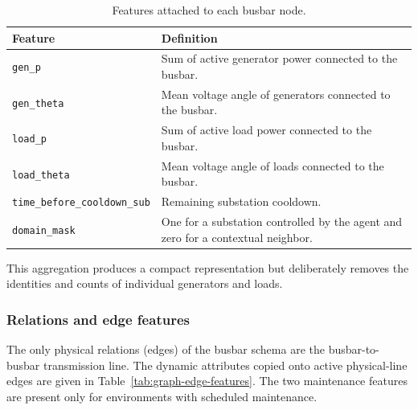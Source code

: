 \begin{table}[H]
  \centering
  \small
  \caption{Features attached to each busbar node.}
  \label{tab:graph-node-features}
  \setlength{\tabcolsep}{5pt}
  \begin{tabular}{L{0.28\textwidth}L{0.62\textwidth}}
    \toprule
    Feature & Definition \\
    \midrule
    \texttt{gen\_p} & Sum of active generator power connected to the busbar. \\
    \texttt{gen\_theta} & Mean voltage angle of generators connected to the busbar. \\
    \texttt{load\_p} & Sum of active load power connected to the busbar. \\
    \texttt{load\_theta} & Mean voltage angle of loads connected to the busbar. \\
    \texttt{time\_before\_cooldown\_sub} & Remaining substation cooldown. \\
    \texttt{domain\_mask} & One for a substation controlled by the agent and zero for a contextual neighbor. \\
    \bottomrule
  \end{tabular}
\end{table}

\noindent This aggregation produces a compact representation but deliberately removes
the identities and counts of individual generators and loads.

\subsubsection{Relations and edge features}
\label{subsec:graph-line-edge-features}

The only physical relations (edges) of the busbar schema are the busbar-to-busbar transmission line.
The dynamic attributes copied onto active physical-line edges are given in
Table~\ref{tab:graph-edge-features}. The two maintenance features are present
only for environments with scheduled maintenance.


